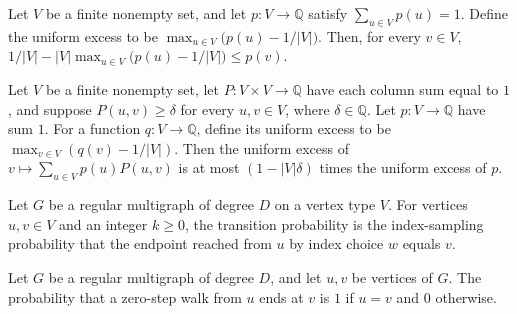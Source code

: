 \begin{theorem}
\label{Randomized.inv_card_sub_le}
\leanok
{}
Let $V$ be a finite nonempty set, and let $p:V\to\mathbb{Q}$ satisfy $\sum_{u\in
V}p(u)=1$. Define the uniform excess to be $\max_{u\in V}\bigl(p(u)-1/|V|\bigr)$. Then,
for every $v\in V$, $1/|V|-|V|\max_{u\in V}\bigl(p(u)-1/|V|\bigr)\le p(v)$.
\end{theorem}

\begin{theorem}
\label{Randomized.uniformExcess_le_of_minorant}
\leanok
{}
Let $V$ be a finite nonempty set, let $P:V\times V\to\mathbb{Q}$ have each column sum
equal to $1$, and suppose $P(u,v)\ge\delta$ for every $u,v\in V$, where
$\delta\in\mathbb{Q}$. Let $p:V\to\mathbb{Q}$ have sum $1$. For a function
$q:V\to\mathbb{Q}$, define its uniform excess to be $\max_{v\in V}(q(v)-1/|V|)$. Then
the uniform excess of $v\mapsto\sum_{u\in V}p(u)P(u,v)$ is at most $(1-|V|\delta)$ times
the uniform excess of $p$.
\end{theorem}

\begin{definition}
\label{Randomized.RegularMultigraph.transProb}
\leanok
{}
Let $G$ be a regular multigraph of degree $D$ on a vertex type $V$. For vertices $u,v\in
V$ and an integer $k\ge 0$, the transition probability is the index-sampling probability
that the endpoint reached from $u$ by index choice $w$ equals $v$.
\end{definition}

\begin{theorem}
\label{Randomized.RegularMultigraph.transProb_zero}
\leanok
{}
Let $G$ be a regular multigraph of degree $D$, and let $u,v$ be vertices of $G$. The
probability that a zero-step walk from $u$ ends at $v$ is $1$ if $u=v$ and $0$
otherwise.
\end{theorem}

